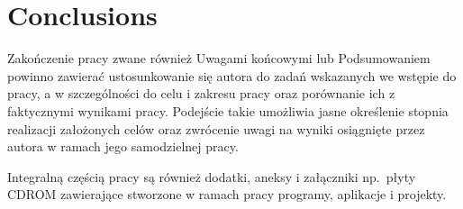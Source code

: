 
\chapter{Conclusions}

Zakończenie pracy zwane również Uwagami końcowymi lub Podsumowaniem powinno zawierać ustosunkowanie
się autora do zadań wskazanych we wstępie do pracy, a w szczególności do celu i zakresu pracy oraz
porównanie ich z faktycznymi wynikami pracy. Podejście takie umożliwia jasne określenie stopnia
realizacji założonych celów oraz zwrócenie uwagi na wyniki osiągnięte przez autora w ramach jego
samodzielnej pracy.

Integralną częścią pracy są również dodatki, aneksy i załączniki np.~płyty CDROM
zawierające stworzone w ramach pracy programy, aplikacje i projekty.
